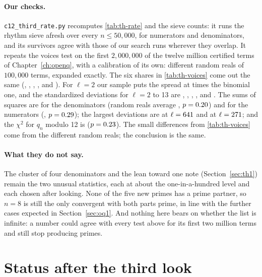 {\sloppy\paragraph{Our checks.} \texttt{c12\_third\_rate.py} recomputes \cref{tab:th-rate} and the sieve counts: it runs the rhythm sieve afresh over every $n \le 50{,}000$, for numerators and denominators, and its survivors agree with those of our search runs wherever they overlap. It repeats the voices test on the first $2{,}000{,}000$ of the twelve million certified terms of Chapter~\ref{ch:openq}, with a calibration of its own: \RaCalR{} different random reals of $100{,}000$ terms, expanded exactly. The six shares in \cref{tab:th-voices} come out the same (\RaSharea, \RaShareb, \RaSharec, \RaShared, \RaSharee{} and \RaSharef). For $\ell = 2$ our sample puts the spread at \RaSdTwo{} times the binomial one, and the standardized deviations for $\ell = 2$ to 13 are \RaZa, \RaZb, \RaZc, \RaZd, \RaZe{} and \RaZf. The sums of squares are \RaSq{} for the denominators (random reals average \RaSqCal, $p = 0.20$) and \RaSp{} for the numerators (\RaSpCal, $p = 0.29$); the largest deviations are \RaMaxQ{} at $\ell = 641$ and \RaMaxP{} at $\ell = 271$; and the $\chi^2$ for $q_n$ modulo 12 is \RaChiTwelve{} ($p = 0.23$). The small differences from \cref{tab:th-voices} come from the different random reals; the conclusion is the same.\par}

\paragraph{What they do not say.} The cluster of four denominators and the lean toward one note (Section~\ref{sec:th1}) remain the two unusual statistics, each at about the one-in-a-hundred level and each chosen after looking. None of the five new primes has a prime partner, so $n = 8$ is still the only convergent with both parts prime, in line with the \OqBothTail{} further cases expected in Section~\ref{sec:oq1}. And nothing here bears on whether the list is infinite: a number could agree with every test above for its first two million terms and still stop producing primes.

\section{Status after the third look}\label{sec:th-status}
\addednote{\revC}

